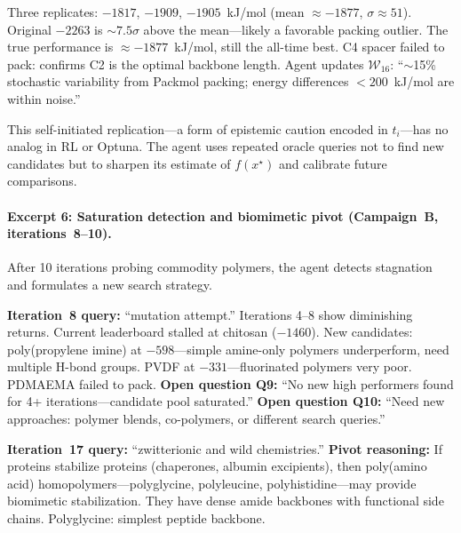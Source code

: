 \documentclass[twocolumn]{fairmeta}
\begin{document}
\begin{observation}
\scriptsize
Three replicates: $-1817$, $-1909$, $-1905$~kJ/mol (mean $\approx -1877$, $\sigma \approx 51$).
Original $-2263$ is ${\sim}7.5\sigma$ above the mean---likely a favorable packing outlier.
The true performance is $\approx -1877$~kJ/mol, still the all-time best.
C4 spacer failed to pack: confirms C2 is the optimal backbone length.
Agent updates $\mathcal{W}_{16}$: ``${\sim}$15\% stochastic variability from Packmol packing; energy differences $< 200$~kJ/mol are within noise.''
\end{observation}

\noindent This self-initiated replication---a form of epistemic caution encoded in $t_i$---has no analog in RL or Optuna.
The agent uses repeated oracle queries not to find new candidates but to sharpen its estimate of $f(x^\star)$ and calibrate future comparisons.

\paragraph{Excerpt 6: Saturation detection and biomimetic pivot (Campaign~B, iterations~8--10).}
After 10 iterations probing commodity polymers, the agent detects stagnation and formulates a new search strategy.

\begin{agentthought}
\scriptsize
\textbf{Iteration~8 query:} ``mutation attempt.''
Iterations 4--8 show diminishing returns.
Current leaderboard stalled at chitosan ($-1460$).
New candidates: poly(propylene imine) at $-598$---simple amine-only polymers underperform, need multiple H-bond groups.
PVDF at $-331$---fluorinated polymers very poor.
PDMAEMA failed to pack.
\textbf{Open question Q9:} ``No new high performers found for 4+ iterations---candidate pool saturated.''
\textbf{Open question Q10:} ``Need new approaches: polymer blends, co-polymers, or different search queries.''
\end{agentthought}

\begin{agentthought}
\scriptsize
\textbf{Iteration~17 query:} ``zwitterionic and wild chemistries.''
\textbf{Pivot reasoning:} If proteins stabilize proteins (chaperones, albumin excipients), then poly(amino acid) homopolymers---polyglycine, polyleucine, polyhistidine---may provide biomimetic stabilization.
They have dense amide backbones with functional side chains.
Polyglycine: simplest peptide backbone.
\end{agentthought}
\end{document}
